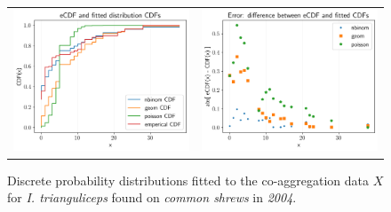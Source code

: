 \documentclass[hidelinks]{article}
\begin{document}
\begin{figure}[]
	\begin{mdframed}[backgroundcolor=grey250,rightline=false,leftline=false,topline=false]
	\centering
	\begin{tabular}{ll}
		\includegraphics[width=.48\linewidth,valign=m]{CDF_compare_2004_I.trianguliceps_SA} & \includegraphics[width=.48\linewidth,valign=m]{CDF_errors_2004_I.trianguliceps_SA}
	\end{tabular}
	\caption{Discrete probability distributions fitted to the co-aggregation data $ X $ for \textit{I. trianguliceps} found on \textit{common shrews} in \textit{2004}.}
	\label{fig:CDF_2004_itrianguliceps_SA}
	\end{mdframed}
\end{figure}
\end{document}
